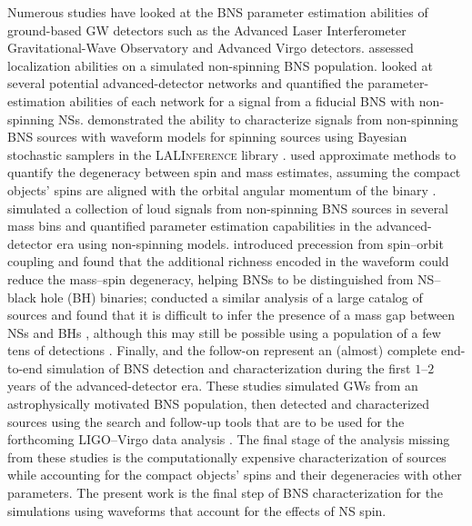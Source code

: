Numerous studies have looked at the BNS parameter estimation abilities of ground-based GW detectors such as the Advanced Laser Interferometer Gravitational-Wave Observatory \citep[aLIGO;][]{Aasi_2015} and Advanced Virgo \citep[AdV;][]{Acernese_2014} detectors. \citet{Nissanke_2010,Nissanke_2011} assessed localization abilities on a simulated non-spinning BNS population. \citet{Veitch_2012} looked at several potential advanced-detector networks and quantified the parameter-estimation abilities of each network for a signal from a fiducial BNS with non-spinning NSs. \citet{Aasi_2013} demonstrated the ability to characterize signals from non-spinning BNS sources with waveform models for spinning sources using Bayesian stochastic samplers in the \textsc{LALInference} library \citep{Veitch_2014}.  \citet{Hannam_2013} used approximate methods to quantify the degeneracy between spin and mass estimates, assuming the compact objects' spins are aligned with the orbital angular momentum of the binary \citep[but see][]{Haster_2015}. \citet{Rodriguez_2014} simulated a collection of loud signals from non-spinning BNS sources in several mass bins and quantified parameter estimation capabilities in the advanced-detector era using non-spinning models.  \citet{Chatziioannou_2014} introduced precession from spin--orbit coupling and found that the additional richness encoded in the waveform could reduce the mass--spin degeneracy, helping BNSs to be distinguished from NS--black hole (BH) binaries; \citet{Littenberg:2015tpa} conducted a similar analysis of a large catalog of sources and found that it is difficult to infer the presence of a mass gap between NSs and BHs \citep{Ozel:2010su,Farr:2010tu,Kreidberg:2012ud}, although this may still be possible using a population of a few tens of detections \citep{Mandel:2015spa}.  Finally, \citet{Singer_2014} and the follow-on \citet{Berry_2014} represent an (almost) complete end-to-end simulation of BNS detection and characterization during the first $1$--$2$ years of the advanced-detector era. These studies simulated GWs from an astrophysically motivated BNS population, then detected and characterized sources using the search and follow-up tools that are to be used for the forthcoming LIGO--Virgo data analysis \citep{WhitePaper2014,TheLIGOScientific:2016wfe}.   The final stage of the analysis missing from these studies is the computationally expensive characterization of sources while accounting for the compact objects' spins and their degeneracies with other parameters.  The present work is the final step of BNS characterization for the \citet{Singer_2014} simulations using waveforms that account for the effects of NS spin.

